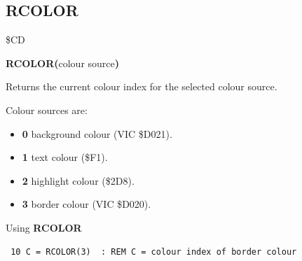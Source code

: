 
\newpage
\subsection{RCOLOR}
\begin{description}[leftmargin=2cm,style=nextline]
\item [Token:] \$CD
\item [Format:] {\bf RCOLOR(}colour source{\bf)}
\item [Usage:]  Returns the current colour index for the
                selected colour source.

                Colour sources are:
                \begin{itemize}
                    \item {\bf 0} background colour (VIC \$D021).
                    \item {\bf 1} text colour (\$F1).
                    \item {\bf 2} highlight colour (\$2D8).
                    \item {\bf 3} border colour (VIC \$D020).
                \end{itemize}

\item [Example:] Using {\bf RCOLOR}

\begin{tcolorbox}[colback=black,coltext=white]
\verbatimfont{\codefont}
\begin{verbatim}
 10 C = RCOLOR(3)  : REM C = colour index of border colour
\end{verbatim}
\end{tcolorbox}
\end{description}


\newpage
